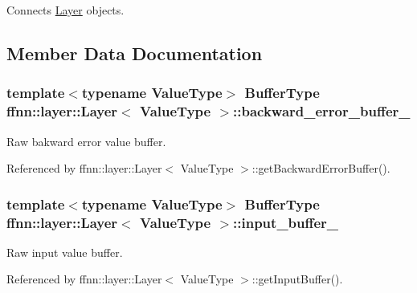 Connects \hyperlink{classffnn_1_1layer_1_1_layer}{Layer} objects. 



\subsection{Member Data Documentation}
\hypertarget{classffnn_1_1layer_1_1_layer_a79d676e9b8bd04d1a438266206d4b321}{
\subsubsection[{backward\-\_\-error\-\_\-buffer\-\_\-}]{\setlength{\rightskip}{0pt plus 5cm}template$<$typename Value\-Type$>$ {\bf Buffer\-Type} {\bf ffnn\-::layer\-::\-Layer}$<$ Value\-Type $>$\-::backward\-\_\-error\-\_\-buffer\-\_\-\hspace{0.3cm}{\ttfamily [protected]}}}\label{classffnn_1_1layer_1_1_layer_a79d676e9b8bd04d1a438266206d4b321}


Raw bakward error value buffer. 



Referenced by ffnn\-::layer\-::\-Layer$<$ Value\-Type $>$\-::get\-Backward\-Error\-Buffer().

\hypertarget{classffnn_1_1layer_1_1_layer_ad4b5ac0708d6ada04d62df4fad377f1a}{
\subsubsection[{input\-\_\-buffer\-\_\-}]{\setlength{\rightskip}{0pt plus 5cm}template$<$typename Value\-Type$>$ {\bf Buffer\-Type} {\bf ffnn\-::layer\-::\-Layer}$<$ Value\-Type $>$\-::input\-\_\-buffer\-\_\-\hspace{0.3cm}{\ttfamily [protected]}}}\label{classffnn_1_1layer_1_1_layer_ad4b5ac0708d6ada04d62df4fad377f1a}


Raw input value buffer. 



Referenced by ffnn\-::layer\-::\-Layer$<$ Value\-Type $>$\-::get\-Input\-Buffer().

